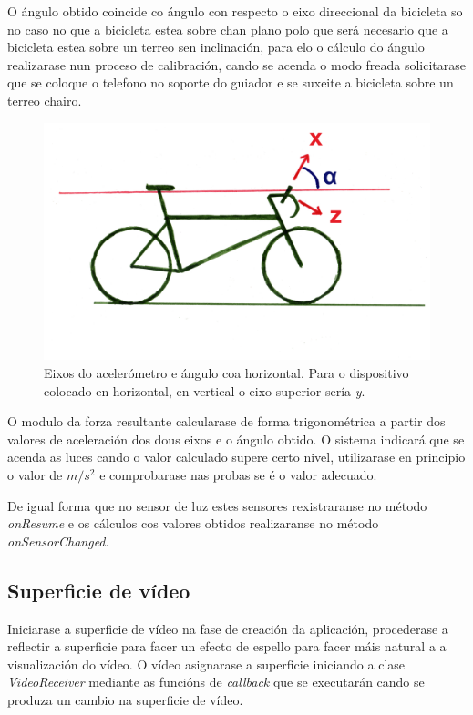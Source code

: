 O ángulo obtido coincide co ángulo con respecto o eixo direccional da bicicleta so no caso no que a bicicleta estea sobre chan plano polo que será necesario que a bicicleta estea sobre un terreo sen inclinación, para elo o cálculo do ángulo realizarase nun proceso de calibración, cando se acenda o modo freada solicitarase que se coloque o telefono no soporte do guiador e se suxeite a bicicleta sobre un terreo chairo.
\begin{figure}[tbp]
  \centering
  \includegraphics[scale=.6]{imaxes/angulo.png}
  \caption{Eixos do acelerómetro e ángulo coa horizontal. Para o dispositivo colocado en horizontal, en vertical o eixo superior sería \emph{y}.}
  \label{fig:angulo}
\end{figure}

O modulo da forza resultante calcularase de forma trigonométrica a partir dos valores de aceleración dos dous eixos e o ángulo obtido. O sistema indicará que se acenda as luces cando o valor calculado supere certo nivel, utilizarase en principio o valor de $m/s^2$ e comprobarase nas probas se é o valor adecuado.

De igual forma que no sensor de luz estes sensores rexistraranse no método \emph{onResume} e os cálculos cos valores obtidos realizaranse no método \emph{onSensorChanged}.

\subsection{Superficie de vídeo}
Iniciarase a superficie de vídeo na fase de creación da aplicación, procederase a reflectir a superficie para facer un efecto de espello para facer máis natural a a visualización do vídeo. O vídeo asignarase a superficie iniciando a clase \emph{VideoReceiver} mediante as funcións de \emph{callback} que se executarán cando se produza un cambio na superficie de vídeo.

